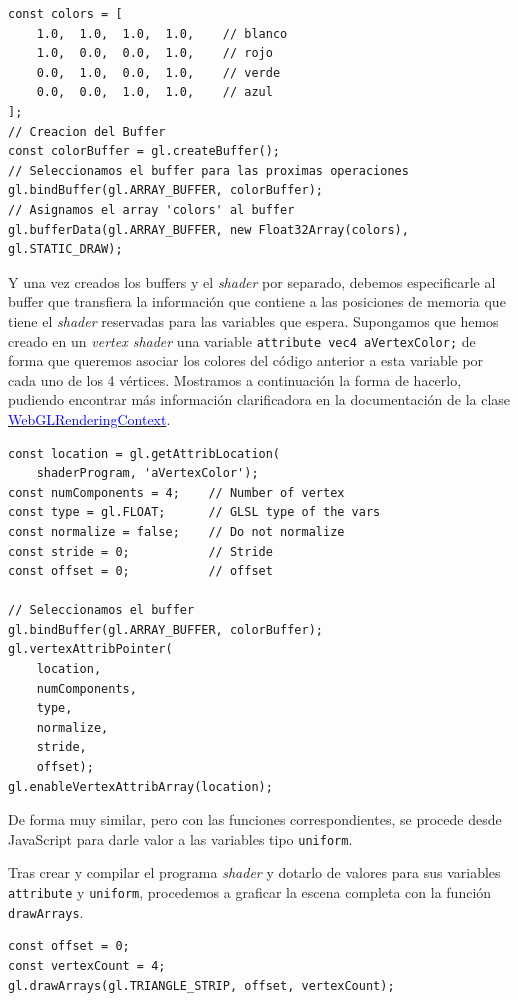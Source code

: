 \begin{lstlisting}
const colors = [
    1.0,  1.0,  1.0,  1.0,    // blanco
    1.0,  0.0,  0.0,  1.0,    // rojo
    0.0,  1.0,  0.0,  1.0,    // verde
    0.0,  0.0,  1.0,  1.0,    // azul
];
// Creacion del Buffer
const colorBuffer = gl.createBuffer();
// Seleccionamos el buffer para las proximas operaciones
gl.bindBuffer(gl.ARRAY_BUFFER, colorBuffer);
// Asignamos el array 'colors' al buffer
gl.bufferData(gl.ARRAY_BUFFER, new Float32Array(colors), gl.STATIC_DRAW);
\end{lstlisting}

Y una vez creados los buffers y el \textit{shader} por separado, debemos especificarle al buffer que transfiera la información que contiene a las posiciones de memoria que tiene el \textit{shader} reservadas para las variables que espera. Supongamos que hemos creado en un \textit{vertex shader} una variable \verb|attribute vec4 aVertexColor;| de forma que queremos asociar los colores del código anterior a esta variable por cada uno de los 4 vértices. Mostramos a continuación la forma de hacerlo, pudiendo encontrar más información clarificadora en la documentación de la clase \href{https://developer.mozilla.org/en-US/docs/Web/API/WebGLRenderingContext}{\textcolor{blue}{WebGLRenderingContext}}.

\begin{lstlisting}
const location = gl.getAttribLocation(
    shaderProgram, 'aVertexColor');
const numComponents = 4;    // Number of vertex
const type = gl.FLOAT;      // GLSL type of the vars
const normalize = false;    // Do not normalize
const stride = 0;           // Stride
const offset = 0;           // offset

// Seleccionamos el buffer
gl.bindBuffer(gl.ARRAY_BUFFER, colorBuffer);
gl.vertexAttribPointer(
    location,
    numComponents,
    type,
    normalize,
    stride,
    offset);
gl.enableVertexAttribArray(location);
\end{lstlisting}

De forma muy similar, pero con las funciones correspondientes, se procede desde JavaScript para darle valor a las variables tipo \verb|uniform|.

Tras crear y compilar el programa \textit{shader} y dotarlo de valores para sus variables \verb|attribute| y \verb|uniform|, procedemos a graficar la escena completa con la función \verb|drawArrays|.

\begin{lstlisting}
const offset = 0;
const vertexCount = 4;
gl.drawArrays(gl.TRIANGLE_STRIP, offset, vertexCount);
\end{lstlisting}

